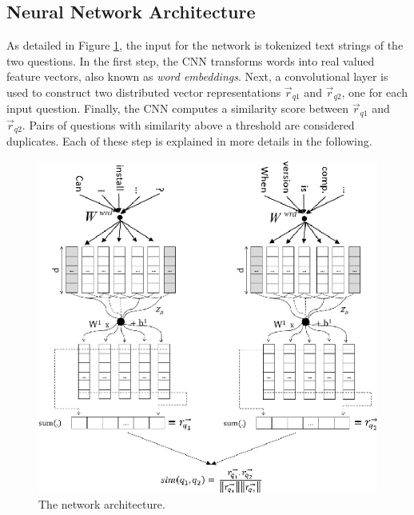 \documentclass[10pt,twocolumn,letterpaper]{article}
\begin{document}
\subsection{Neural Network Architecture}
As detailed in Figure \ref{fig:network}, the input for the network is tokenized text strings of the two questions. In the first step, the CNN transforms words into real valued feature vectors, also known as \emph{word embeddings}. Next, a convolutional layer is used to construct two distributed vector representations $\vec{r}_{q1}$ and $\vec{r}_{q2}$, one for each input question. Finally, the CNN computes a similarity score between $\vec{r}_{q1}$ and $\vec{r}_{q2}$. Pairs of questions with similarity above a threshold are considered duplicates. Each of these step is explained in more details in the following.
\begin{figure}[t]
\begin{center}
\includegraphics[width=0.8\linewidth]{img/network.png}
\end{center}
\caption{The network architecture.}
\label{fig:network}
\end{figure}
\end{document}
